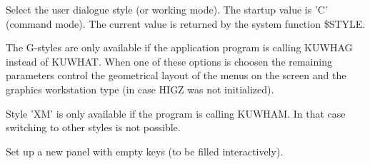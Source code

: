    \par
Select the user dialogue style (or working mode).  The startup value is 'C' 
   (command mode).  The current value is returned by the system function 
   \$STYLE.  

   \par
The G-styles are only available if the application program is calling 
   KUWHAG instead of KUWHAT.  When one of these options is choosen the 
   remaining parameters control the geometrical layout of the menus on the 
   screen and the graphics workstation type (in case HIGZ was not 
   initialized).  

   \par
Style 'XM' is only available if the program is calling KUWHAM.  In that 
   case switching to other styles is not possible.  

\ENDCMD


\BEGARG
{}
\ENDARG

   \par
Set up a new panel with empty keys (to be filled interactively).  

\ENDCMD


\BEGARG
{}
\ENDARG

